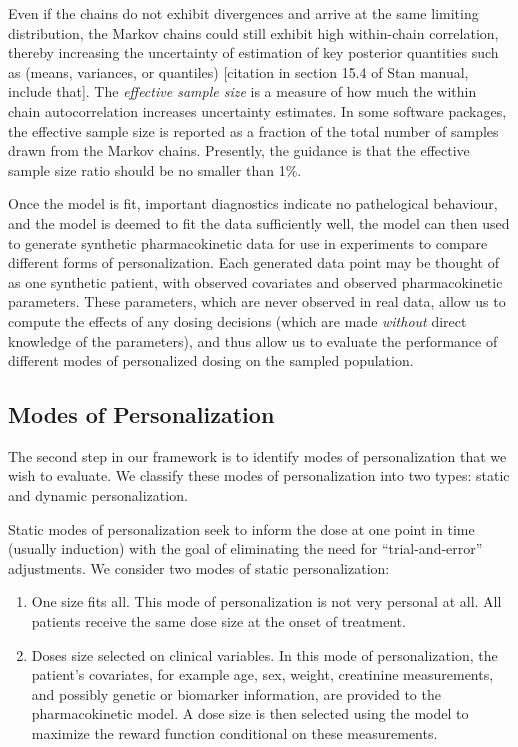 Even if the chains do not exhibit divergences and arrive at the same limiting distribution, the Markov chains could still exhibit high within-chain correlation, thereby increasing the uncertainty of estimation of key posterior quantities such as (means, variances, or quantiles) [citation in section 15.4 of Stan manual, include that].  The \textit{effective sample size} is a measure of how much the within chain autocorrelation increases uncertainty estimates.  In some software packages, the effective sample size is reported as a fraction of the total number of samples drawn from the Markov chains.  Presently, the guidance is that the effective sample size ratio should be no smaller than 1\%.

Once the model is fit, important diagnostics indicate no pathelogical behaviour, and the model is deemed to fit the data sufficiently well, the model can then used to generate synthetic pharmacokinetic data for use in experiments to compare different forms of personalization. Each generated data point may be thought of as one synthetic patient, with observed covariates and observed pharmacokinetic parameters. These parameters, which are never observed in real data, allow us to compute the effects of any dosing decisions (which are made \textit{without} direct knowledge of the parameters), and thus allow us to evaluate the performance of different modes of personalized dosing on the sampled population. 

\subsection{Modes of Personalization}

The second step in our framework is to identify modes of personalization that we wish to evaluate. We classify these modes of personalization into two types: static and dynamic personalization.

Static modes of personalization seek to inform the dose at one point in time (usually induction) with the goal of eliminating the need for ``trial-and-error'' adjustments.  We consider two modes of static personalization:

\begin{enumerate}
	\item One size fits all.  This mode of personalization is not very personal at all.  All patients receive the same dose size at the onset of treatment.
	\item Doses size selected on clinical variables.  In this mode of personalization, the patient's covariates, for example age, sex, weight, creatinine measurements, and possibly genetic or biomarker information, are provided to the pharmacokinetic model.  A dose size is then selected using the model to maximize the reward function conditional on these measurements.
\end{enumerate}

